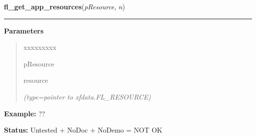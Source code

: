 \hspace{.8\funcindent}\begin{boxedminipage}{\funcwidth}

    \raggedright \textbf{fl\_get\_app\_resources}(\textit{pResource}, \textit{n})

    \vspace{-1.5ex}

    \rule{\textwidth}{0.5\fboxrule}
\setlength{\parskip}{2ex}
\setlength{\parskip}{1ex}
      \textbf{Parameters}
      \vspace{-1ex}

      \begin{quote}
        \begin{Ventry}{xxxxxxxxx}

          \item[pResource]

          resource

            {\it (type=pointer to xfdata.FL\_RESOURCE)}

        \end{Ventry}

      \end{quote}

\textbf{Example:} ??



\textbf{Status:} Untested + NoDoc + NoDemo = NOT OK



    \end{boxedminipage}

    \label{xformslib:flxbasic:fl_set_graphics_mode}

    \vspace{0.5ex}

